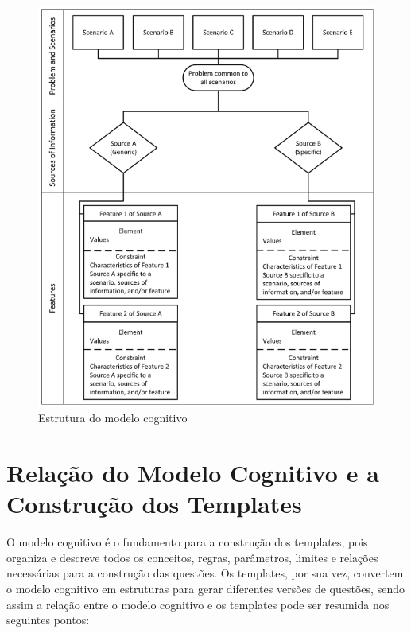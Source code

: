 \begin{figure}[ht]
	\centering
	\includegraphics[width=12cm]{./imagens/capitulo4/cognitive-model}
	\caption{Estrutura do modelo cognitivo \parencite{gierl2021} }
	\label{fig:cognitive-model}
\end{figure}


\section{Relação do Modelo Cognitivo e a Construção dos Templates }

O modelo cognitivo é o fundamento para a construção dos templates, pois organiza e descreve todos os conceitos, regras, parâmetros, limites e relações necessárias para a construção das questões. Os templates, por sua vez, convertem o modelo cognitivo em estruturas para gerar diferentes versões de questões, sendo assim a relação entre o modelo cognitivo e os templates pode ser resumida nos seguintes pontos:


